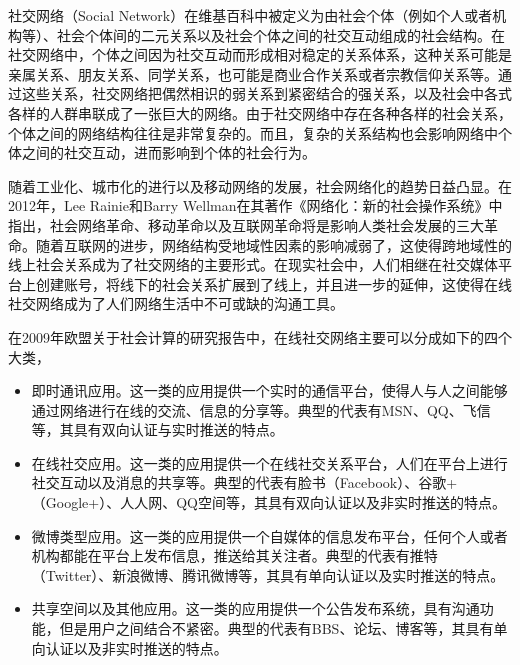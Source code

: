 社交网络（Social Network）在维基百科中被定义为由社会个体（例如个人或者机构等）、社会个体间的二元关系以及社会个体之间的社交互动组成的社会结构。在社交网络中，个体之间因为社交互动而形成相对稳定的关系体系，这种关系可能是亲属关系、朋友关系、同学关系，也可能是商业合作关系或者宗教信仰关系等。通过这些关系，社交网络把偶然相识的弱关系到紧密结合的强关系，以及社会中各式各样的人群串联成了一张巨大的网络。由于社交网络中存在各种各样的社会关系，个体之间的网络结构往往是非常复杂的。而且，复杂的关系结构也会影响网络中个体之间的社交互动，进而影响到个体的社会行为。

随着工业化、城市化的进行以及移动网络的发展，社会网络化的趋势日益凸显。在2012年，Lee Rainie和Barry Wellman在其著作《网络化：新的社会操作系统》中指出，社会网络革命、移动革命以及互联网革命将是影响人类社会发展的三大革命。随着互联网的进步，网络结构受地域性因素的影响减弱了，这使得跨地域性的线上社会关系成为了社交网络的主要形式。在现实社会中，人们相继在社交媒体平台上创建账号，将线下的社会关系扩展到了线上，并且进一步的延伸，这使得在线社交网络成为了人们网络生活中不可或缺的沟通工具。

在2009年欧盟关于社会计算的研究报告中，在线社交网络主要可以分成如下的四个大类，
\begin{itemize}
	\item 即时通讯应用。这一类的应用提供一个实时的通信平台，使得人与人之间能够通过网络进行在线的交流、信息的分享等。典型的代表有MSN、QQ、飞信等，其具有双向认证与实时推送的特点。
	\item 在线社交应用。这一类的应用提供一个在线社交关系平台，人们在平台上进行社交互动以及消息的共享等。典型的代表有脸书（Facebook）、谷歌+（Google+）、人人网、QQ空间等，其具有双向认证以及非实时推送的特点。
	\item 微博类型应用。这一类的应用提供一个自媒体的信息发布平台，任何个人或者机构都能在平台上发布信息，推送给其关注者。典型的代表有推特（Twitter）、新浪微博、腾讯微博等，其具有单向认证以及实时推送的特点。
	\item 共享空间以及其他应用。这一类的应用提供一个公告发布系统，具有沟通功能，但是用户之间结合不紧密。典型的代表有BBS、论坛、博客等，其具有单向认证以及非实时推送的特点。
\end{itemize}

